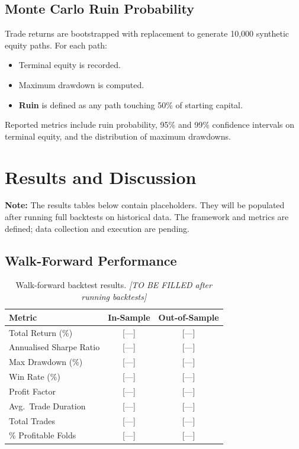 \documentclass[12pt,a4paper]{article}
\begin{document}
\subsection{Monte Carlo Ruin Probability}

Trade returns are bootstrapped with replacement to generate 10{,}000 synthetic equity paths. For each path:
\begin{itemize}[leftmargin=*]
    \item Terminal equity is recorded.
    \item Maximum drawdown is computed.
    \item \textbf{Ruin} is defined as any path touching 50\% of starting capital.
\end{itemize}

Reported metrics include ruin probability, 95\% and 99\% confidence intervals on terminal equity, and the distribution of maximum drawdowns.

\section{Results and Discussion}
\label{sec:results}

\begin{center}
\colorbox{yellow!20}{\parbox{0.9\textwidth}{
\textbf{Note:} The results tables below contain placeholders. They will be populated after running full backtests on historical data. The framework and metrics are defined; data collection and execution are pending.
}}
\end{center}

\subsection{Walk-Forward Performance}

\begin{table}[h!]
\centering
\caption{Walk-forward backtest results. \textit{[TO BE FILLED after running backtests]}}
\label{tab:results}
\begin{tabular}{@{}lcc@{}}
\toprule
\textbf{Metric} & \textbf{In-Sample} & \textbf{Out-of-Sample} \\
\midrule
Total Return (\%) & [---] & [---] \\
Annualised Sharpe Ratio & [---] & [---] \\
Max Drawdown (\%) & [---] & [---] \\
Win Rate (\%) & [---] & [---] \\
Profit Factor & [---] & [---] \\
Avg.\ Trade Duration & [---] & [---] \\
Total Trades & [---] & [---] \\
\% Profitable Folds & [---] & [---] \\
\bottomrule
\end{tabular}
\end{table}
\end{document}
